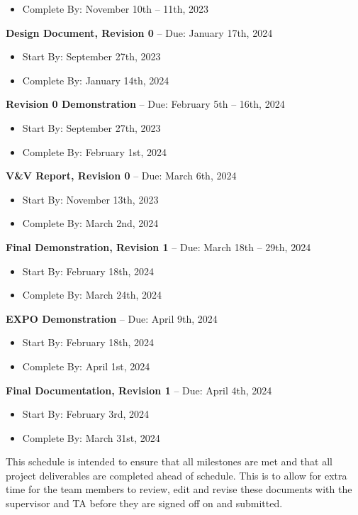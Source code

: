 \documentclass{article}
\begin{document}
\begin{itemize}
\begin{item}
\begin{itemize}
\item Complete By: November 10th – 11th, 2023
\end{itemize}
\end{item}
\begin{item}
\textbf{Design Document, Revision 0} – Due: January 17th, 2024
\begin{itemize}
\item Start By: September 27th, 2023
\item Complete By: January 14th, 2024
\end{itemize}
\end{item}
\begin{item}
\textbf{Revision 0 Demonstration} – Due: February 5th – 16th, 2024
\begin{itemize}
\item Start By: September 27th, 2023
\item Complete By: February 1st, 2024
\end{itemize}
\end{item}
\begin{item}
\textbf{V\&V Report, Revision 0} – Due: March 6th, 2024
\begin{itemize}
\item Start By: November 13th, 2023
\item Complete By: March 2nd, 2024
\end{itemize}
\end{item}
\begin{item}
\textbf{Final Demonstration, Revision 1} – Due: March 18th – 29th, 2024
\begin{itemize}
\item Start By: February 18th, 2024
\item Complete By: March 24th, 2024
\end{itemize}
\end{item}
\begin{item}
\textbf{EXPO Demonstration} – Due: April 9th, 2024
\begin{itemize}
\item Start By: February 18th, 2024
\item Complete By: April 1st, 2024
\end{itemize}
\end{item}
\begin{item}
\textbf{Final Documentation, Revision 1} – Due: April 4th, 2024
\begin{itemize}
\item Start By: February 3rd, 2024
\item Complete By: March 31st, 2024
\end{itemize}
\end{item}
\end{itemize}

\noindent This schedule is intended to ensure that all milestones are met and that all project deliverables are completed ahead of schedule.
This is to allow for extra time for the team members to review, edit and revise these documents with the supervisor and TA before they are signed off on and submitted.
\end{document}
